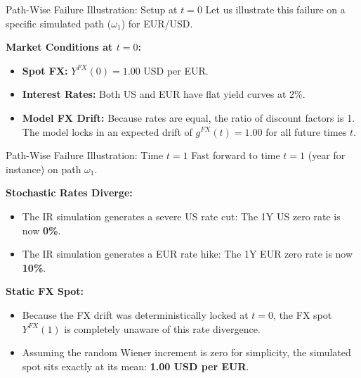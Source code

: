 \documentclass{beamer}
\begin{document}
	\begin{frame}{Path-Wise Failure Illustration: Setup at $t=0$}
		Let us illustrate this failure on a specific simulated path ($\omega_1$) for EUR/USD.
		
		\vspace{0.5cm}
		\textbf{Market Conditions at $t=0$:}
		\begin{itemize}
			\item \textbf{Spot FX:} $Y^{FX}(0) = 1.00$ USD per EUR.
			\item \textbf{Interest Rates:} Both US and EUR have flat yield curves at 2\%.
			\item \textbf{Model FX Drift:} Because rates are equal, the ratio of discount factors is 1. The model locks in an expected drift of $g^{FX}(t) = 1.00$ for all future times $t$.
		\end{itemize}
	\end{frame}
	
	\begin{frame}{Path-Wise Failure Illustration: Time $t=1$}
		Fast forward to time $t=1$ (year for instance) on path $\omega_1$.
		
		\vspace{0.5cm}
		\textbf{Stochastic Rates Diverge:}
		\begin{itemize}
			\item The IR simulation generates a severe US rate cut: The 1Y US zero rate is now \textbf{0\%}.
			\item The IR simulation generates a EUR rate hike: The 1Y EUR zero rate is now \textbf{10\%}.
		\end{itemize}
		
		\vspace{0.5cm}
		\textbf{Static FX Spot:}
		\begin{itemize}
			\item Because the FX drift was deterministically locked at $t=0$, the FX spot $Y^{FX}(1)$ is completely unaware of this rate divergence. 
			\item Assuming the random Wiener increment is zero for simplicity, the simulated spot sits exactly at its mean: \textbf{1.00 USD per EUR}.
		\end{itemize}
	\end{frame}
	
\end{document}
